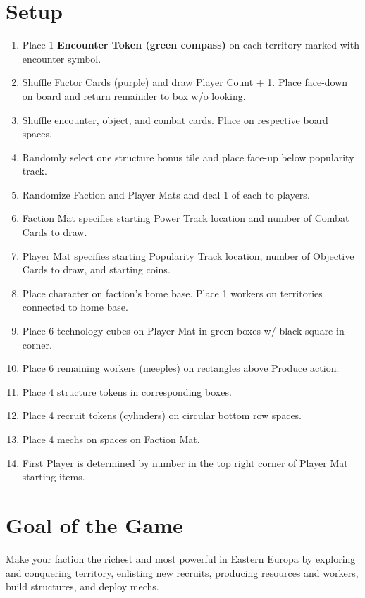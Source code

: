 \documentclass[12pt]{article}
\newenvironment{enumerateCustom}
{\begin{enumerate}
  \setlength{\itemsep}{1pt}
  \setlength{\parskip}{0pt}
  \setlength{\parsep}{0pt}}
{\end{enumerate}}
\begin{document}
\begin{multicols*}{2}

\section*{Setup}
\begin{enumerateCustom}
    \item Place 1 \textbf{Encounter Token (green compass)} on each territory marked with encounter symbol.
    \item Shuffle Factor Cards (purple) and draw Player Count + 1. Place face-down on board and return remainder to box w/o looking.
    \item Shuffle encounter, object, and combat cards. Place on respective board spaces.
    \item Randomly select one structure bonus tile and place face-up below popularity track.
    \item Randomize Faction and Player Mats and deal 1 of each to players.
    \item Faction Mat specifies starting Power Track location and number of Combat Cards to draw.
    \item Player Mat specifies starting Popularity Track location, number of Objective Cards to draw, and starting coins.
    \item Place character on faction's home base. Place 1 workers on territories connected to home base.
    \item Place 6 technology cubes on Player Mat in green boxes w/ black square in corner.
    \item Place 6 remaining workers (meeples) on rectangles above Produce action.
    \item Place 4 structure tokens in corresponding boxes.
    \item Place 4 recruit tokens (cylinders) on circular bottom row spaces.
    \item Place 4 mechs on spaces on Faction Mat.
    \item First Player is determined by number in the top right corner of Player Mat starting items.
\end{enumerateCustom}

\section*{Goal of the Game}
Make your faction the richest and most powerful in Eastern Europa by exploring and conquering territory, enlisting new recruits, producing resources and workers, build structures, and deploy mechs.


\end{multicols*}
\end{document}
